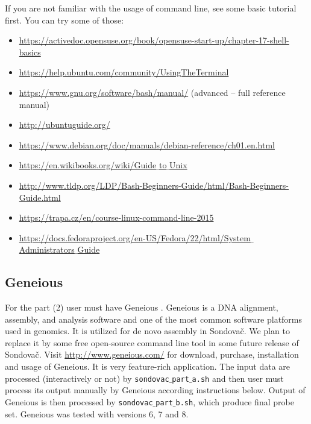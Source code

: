 \documentclass[a4paper, 11pt, twoside]{article}
\begin{document}
If you are not familiar with the usage of command line, see some basic tutorial first. You can try some of those:

\begin{itemize}
\item \href{https://activedoc.opensuse.org/book/opensuse-start-up/chapter-17-shell-basics}{https://activedoc.opensuse.org/book/opensuse-start-up/chapter-17-shell-basics}
\item \href{https://help.ubuntu.com/community/UsingTheTerminal}{https://help.ubuntu.com/community/UsingTheTerminal}
\item \href{https://www.gnu.org/software/bash/manual/}{https://www.gnu.org/software/bash/manual/} (advanced -- full reference manual)
\item \href{http://ubuntuguide.org/}{http://ubuntuguide.org/}
\item \href{https://www.debian.org/doc/manuals/debian-reference/ch01.en.html}{https://www.debian.org/doc/manuals/debian-reference/ch01.en.html}
\item \href{https://en.wikibooks.org/wiki/Guide_to_Unix}{https://en.wikibooks.org/wiki/Guide$\_$to$\_$Unix}
\item \href{http://www.tldp.org/LDP/Bash-Beginners-Guide/html/Bash-Beginners-Guide.html}{http://www.tldp.org/LDP/Bash-Beginners-Guide/html/Bash-Beginners-Guide.html}
\item \href{https://trapa.cz/en/course-linux-command-line-2015}{https://trapa.cz/en/course-linux-command-line-2015}
\item \href{https://docs.fedoraproject.org/en-US/Fedora/22/html/System_Administrators_Guide}{https://docs.fedoraproject.org/en-US/Fedora/22/html/System$\_$Administrators$\_$Guide}
\end{itemize}

\subsection{Geneious}
\label{geneious}

For the part (2) user must have Geneious \citep{Kearse2012}. Geneious is a DNA alignment, assembly, and analysis software and one of the most common software platforms used in genomics. It is utilized for de novo assembly in Sondovač. We plan to replace it by some free open-source command line tool in some future release of Sondovač. Visit \href{http://www.geneious.com/}{http://www.geneious.com/} for download, purchase, installation and usage of Geneious. It is very feature-rich application. The input data are processed (interactively or not) by \texttt{sondovac$\_$part$\_$a.sh} and then user must process its output manually by Geneious according instructions below. Output of Geneious is then processed by \texttt{sondovac$\_$part$\_$b.sh}, which produce final probe set. Geneious was tested with versions 6, 7 and 8.
\end{document}
